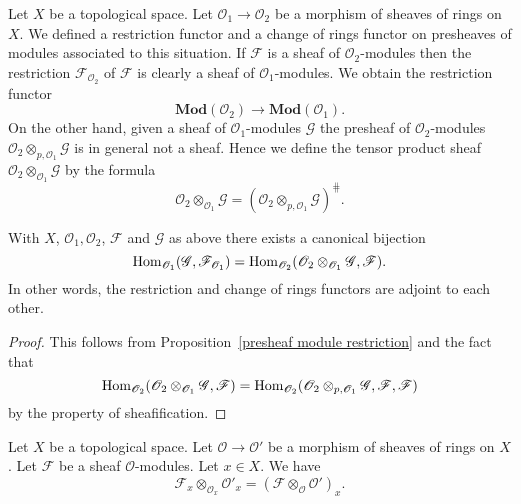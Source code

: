 Let $X$ be a topological space. Let $\mathscr{O}_1\to\mathscr{O}_2$ be a morphism of sheaves of rings on $X$. We defined a restriction functor and a change of rings functor on presheaves of modules associated to this situation. If $\mathscr{F}$ is a sheaf of $\mathscr{O}_2$-modules then the restriction $\mathscr{F}_{\mathscr{O}_2}$ of $\mathscr{F}$ is clearly a sheaf of $\mathscr{O}_1$-modules. We obtain the restriction functor
\[\mathbf{Mod}(\mathscr{O}_2)\to\mathbf{Mod}(\mathscr{O}_1).\]
On the other hand, given a sheaf of $\mathscr{O}_1$-modules $\mathscr{G}$ the presheaf of $\mathscr{O}_2$-modules $\mathscr{O}_2\otimes_{p,\mathscr{O}_1}\mathscr{G}$ is in general not a sheaf. Hence we define the tensor product sheaf $\mathscr{O}_2\otimes_{\mathscr{O}_1}\mathscr{G}$ by the formula
\[\mathscr{O}_2\otimes_{\mathscr{O}_1}\mathscr{G}=(\mathscr{O}_2\otimes_{p,\mathscr{O}_1}\mathscr{G})^{\hash}.\]
\begin{proposition}\label{sheaf module restrict adj}
With $X$, $\mathscr{O}_1,\mathscr{O}_2$, $\mathscr{F}$ and $\mathscr{G}$ as above there exists a canonical bijection
\[\mathrm{Hom}_{\mathscr{O}_1}(\mathscr{G},\mathscr{F}_{\mathscr{O}_1})=\mathrm{Hom}_{\mathscr{O}_2}(\mathscr{O}_2\otimes_{\mathscr{O}_1}\mathscr{G},\mathscr{F}).\]
In other words, the restriction and change of rings functors are adjoint to each other.
\end{proposition}
\begin{proof}
This follows from Proposition~\ref{presheaf module restriction} and the fact that \[\mathrm{Hom}_{\mathscr{O}_2}(\mathscr{O}_2\otimes_{\mathscr{O}_1}\mathscr{G},\mathscr{F})=\mathrm{Hom}_{\mathscr{O}_2}(\mathscr{O}_2\otimes_{p,\mathscr{O}_1}\mathscr{G},\mathscr{F},\mathscr{F})\]
by the property of sheafification.
\end{proof}
\begin{proposition}\label{ext module stalk}
Let $X$ be a topological space. Let $\mathscr{O}\to\mathscr{O}'$ be a morphism of sheaves of rings on $X$. Let $\mathscr{F}$ be a sheaf $\mathscr{O}$-modules. Let $x\in X$. We have
\[\mathscr{F}_x\otimes_{\mathscr{O}_x}\mathscr{O}'_x=(\mathscr{F}\otimes_{\mathscr{O}}\mathscr{O}')_x.\]
\end{proposition}
